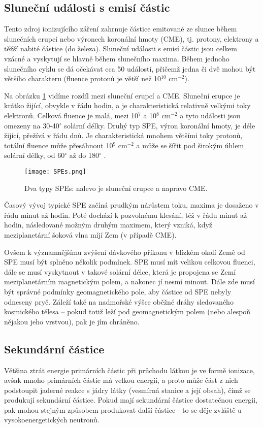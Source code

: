 \subsection{Sluneční události s emisí částic}
Tento zdroj ionizujícího záření zahrnuje částice emitované ze slunce během slunečních erupcí nebo výronech koronální hmoty (CME), tj. protony, elektrony a těžší nabité částice (do železa). Sluneční události s emisí částic jsou celkem vzácné a vyskytují se hlavně během slunečního maxima. Během jednoho slunečního cyklu se dá očekávat cca 50 událostí, přičemž jedna či dvě mohou být většího charakteru (fluence protonů je větší než 10$^{10}$ cm$^{-2}$).

Na obrázku \ref{fig:SPEs} vidíme rozdíl mezi sluneční erupcí a CME. Sluneční erupce je krátko žijící, obvykle v řádu hodin, a je charakteristická relativně velkými toky elektronů. Celková fluence je malá, mezi 10$^7$ a 10$^8$ cm$^{-2}$ a tyto události jsou omezeny na 30-40$^\circ$ solární délky. Druhý typ SPE, výron koronální hmoty, je déle žijící, přežívá v řádu dnů. Je charakteristická mnohem většími toky protonů, totální fluence může přesáhnout 10$^9$ cm$^{-2}$ a může se šířit pod širokým úhlem solární délky, od 60$^\circ$ až do 180$^\circ$ \cite{benton}.

\begin{figure}[H]
  \centering
  \texttt{[image: SPEs.png]}
  \caption{Dva typy SPEs: nalevo je sluneční erupce a napravo CME. \cite{benton}}
  \label{fig:SPEs}
\end{figure}

Časový vývoj typické SPE začíná prudkým nárůstem toku, maxima je dosaženo v řádu minut až hodin. Poté dochází k pozvolnému klesání, též v řádu minut až hodin, následované možným druhým maximem, který vzniká, když meziplanetární šoková vlna míjí Zem (v případě CME).

Ovšem k významnějšímu zvýšení dávkového příkonu v blízkém okolí Země od SPE musí být splněno několik podmínek. SPE musí mít velikou celkovou fluenci, dále se musí vyskytnout v takové solární délce, která je propojena se Zemí meziplanetárním magnetickým polem, a nakonec jí nesmí minout. Dále zde musí být správné podmínky geomagnetického pole, aby částice od SPE nebyly odneseny pryč. Záleží také na nadmořské výšce oběžné dráhy sledovaného kosmického tělesa -- pokud totiž leží pod geomagnetickým polem (nebo alespoň nějakou jeho vrstvou), pak je jím chráněno.
\subsection{Sekundární částice}
Většina ztrát energie primárních částic při průchodu látkou je ve formě ionizace, avšak mnoho primárních částic má velkou energii, a proto může část z nich podstoupit jaderné reakce s jádry látky (vesmírná stanice a její obsah), čímž se produkují sekundární částice. Pokud mají sekundární částice dostatečnou energii, pak mohou stejným způsobem produkovat další částice - to se děje zvláště u vysokoenergetických neutronů.

